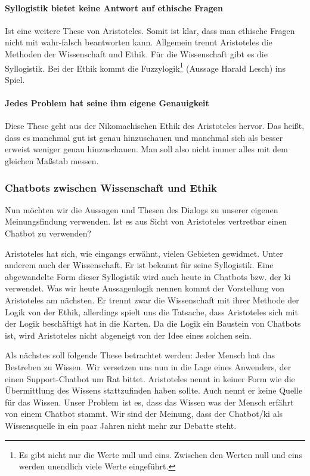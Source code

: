\paragraph{Syllogistik bietet keine Antwort auf ethische Fragen} 
Ist eine weitere These von Aristoteles. Somit ist klar, dass man ethische Fragen nicht mit wahr-falsch beantworten kann. Allgemein trennt Aristoteles die Methoden der Wissenschaft und Ethik. Für die Wissenschaft gibt es die Syllogistik. Bei der Ethik kommt die Fuzzylogik\footnote{Es gibt nicht nur die Werte null und eins. Zwischen  den Werten null und eins werden unendlich viele Werte eingeführt.} (Aussage Harald Lesch) ins Spiel.

\paragraph{Jedes Problem hat seine ihm eigene Genauigkeit} 
Diese These geht aus der Nikomachischen Ethik des Aristoteles hervor. Das heißt, dass es manchmal gut ist genau hinzuschauen und manchmal sich als besser erweist weniger genau hinzuschauen. Man soll also nicht immer alles mit dem gleichen Maßstab messen.

\subsubsection{Chatbots zwischen Wissenschaft und Ethik}

Nun möchten wir die Aussagen und Thesen des Dialogs zu unserer eigenen Meinungsfindung verwenden. Ist es aus Sicht von Aristoteles vertretbar einen Chatbot zu verwenden? 

Aristoteles hat sich, wie eingangs erwähnt, vielen Gebieten gewidmet. Unter anderem auch der Wissenschaft. Er ist bekannt für seine Syllogistik. Eine abgewandelte Form dieser Syllogistik wird auch heute in Chatbots bzw. der \ac{ki} verwendet. Was wir heute Aussagenlogik nennen kommt der Vorstellung von Aristoteles am nächsten. Er trennt zwar die Wissenschaft mit ihrer Methode der Logik von der Ethik, allerdings spielt uns die Tatsache, dass Aristoteles sich mit der Logik beschäftigt hat in die Karten. Da die Logik ein Baustein von Chatbots ist, wird Aristoteles nicht abgeneigt von der Idee eines solchen sein. 

Als nächstes soll folgende These betrachtet werden: \glqq Jeder Mensch hat das Bestreben zu Wissen\grqq. 
Wir versetzen uns nun in die Lage eines Anwenders, der einen Support-Chatbot um Rat bittet. Aristoteles nennt in keiner Form wie die Übermittlung des Wissens stattzufinden haben sollte. Auch nennt er keine Quelle für das Wissen. 
Unser \glqq Problem\grqq\ ist es, dass das Wissen was der Mensch erfährt von einem Chatbot stammt. Wir sind der Meinung, dass der Chatbot/\ac{ki} als Wissensquelle in ein paar Jahren nicht mehr zur Debatte steht. 

